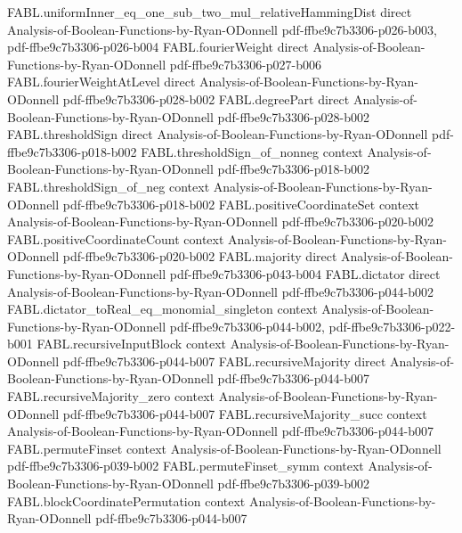 \begin{theorem}
\proofstep
  {FABL.uniformInner_eq_one_sub_two_mul_relativeHammingDist}
  {direct}
  {Analysis-of-Boolean-Functions-by-Ryan-ODonnell}
  {pdf-ffbe9c7b3306-p026-b003,
    pdf-ffbe9c7b3306-p026-b004}
\proofstep
  {FABL.fourierWeight}
  {direct}
  {Analysis-of-Boolean-Functions-by-Ryan-ODonnell}
  {pdf-ffbe9c7b3306-p027-b006}
\proofstep
  {FABL.fourierWeightAtLevel}
  {direct}
  {Analysis-of-Boolean-Functions-by-Ryan-ODonnell}
  {pdf-ffbe9c7b3306-p028-b002}
\proofstep
  {FABL.degreePart}
  {direct}
  {Analysis-of-Boolean-Functions-by-Ryan-ODonnell}
  {pdf-ffbe9c7b3306-p028-b002}
\proofstep
  {FABL.thresholdSign}
  {direct}
  {Analysis-of-Boolean-Functions-by-Ryan-ODonnell}
  {pdf-ffbe9c7b3306-p018-b002}
\proofstep
  {FABL.thresholdSign_of_nonneg}
  {context}
  {Analysis-of-Boolean-Functions-by-Ryan-ODonnell}
  {pdf-ffbe9c7b3306-p018-b002}
\proofstep
  {FABL.thresholdSign_of_neg}
  {context}
  {Analysis-of-Boolean-Functions-by-Ryan-ODonnell}
  {pdf-ffbe9c7b3306-p018-b002}
\proofstep
  {FABL.positiveCoordinateSet}
  {context}
  {Analysis-of-Boolean-Functions-by-Ryan-ODonnell}
  {pdf-ffbe9c7b3306-p020-b002}
\proofstep
  {FABL.positiveCoordinateCount}
  {context}
  {Analysis-of-Boolean-Functions-by-Ryan-ODonnell}
  {pdf-ffbe9c7b3306-p020-b002}
\proofstep
  {FABL.majority}
  {direct}
  {Analysis-of-Boolean-Functions-by-Ryan-ODonnell}
  {pdf-ffbe9c7b3306-p043-b004}
\proofstep
  {FABL.dictator}
  {direct}
  {Analysis-of-Boolean-Functions-by-Ryan-ODonnell}
  {pdf-ffbe9c7b3306-p044-b002}
\proofstep
  {FABL.dictator_toReal_eq_monomial_singleton}
  {context}
  {Analysis-of-Boolean-Functions-by-Ryan-ODonnell}
  {pdf-ffbe9c7b3306-p044-b002,
    pdf-ffbe9c7b3306-p022-b001}
\proofstep
  {FABL.recursiveInputBlock}
  {context}
  {Analysis-of-Boolean-Functions-by-Ryan-ODonnell}
  {pdf-ffbe9c7b3306-p044-b007}
\proofstep
  {FABL.recursiveMajority}
  {direct}
  {Analysis-of-Boolean-Functions-by-Ryan-ODonnell}
  {pdf-ffbe9c7b3306-p044-b007}
\proofstep
  {FABL.recursiveMajority_zero}
  {context}
  {Analysis-of-Boolean-Functions-by-Ryan-ODonnell}
  {pdf-ffbe9c7b3306-p044-b007}
\proofstep
  {FABL.recursiveMajority_succ}
  {context}
  {Analysis-of-Boolean-Functions-by-Ryan-ODonnell}
  {pdf-ffbe9c7b3306-p044-b007}
\proofstep
  {FABL.permuteFinset}
  {context}
  {Analysis-of-Boolean-Functions-by-Ryan-ODonnell}
  {pdf-ffbe9c7b3306-p039-b002}
\proofstep
  {FABL.permuteFinset_symm}
  {context}
  {Analysis-of-Boolean-Functions-by-Ryan-ODonnell}
  {pdf-ffbe9c7b3306-p039-b002}
\proofstep
  {FABL.blockCoordinatePermutation}
  {context}
  {Analysis-of-Boolean-Functions-by-Ryan-ODonnell}
  {pdf-ffbe9c7b3306-p044-b007}

\end{theorem}
